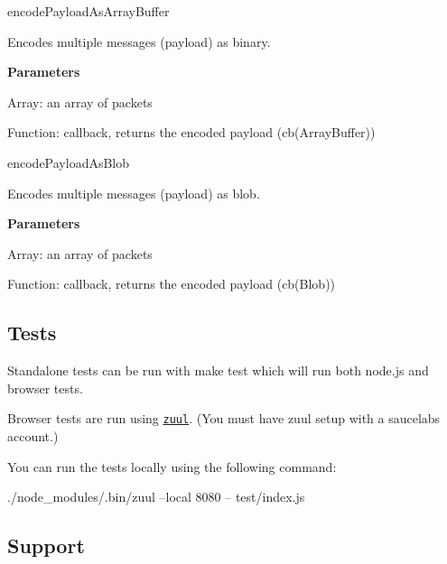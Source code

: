 \begin{DoxyItemize}
\item {\ttfamily encode\+Payload\+As\+Array\+Buffer}
\begin{DoxyItemize}
\item Encodes multiple messages (payload) as binary.
\item {\bfseries Parameters}
\begin{DoxyItemize}
\item {\ttfamily Array}\+: an array of packets
\item {\ttfamily Function}\+: callback, returns the encoded payload ({\ttfamily cb(\+Array\+Buffer)})
\end{DoxyItemize}
\end{DoxyItemize}
\item {\ttfamily encode\+Payload\+As\+Blob}
\begin{DoxyItemize}
\item Encodes multiple messages (payload) as blob.
\item {\bfseries Parameters}
\begin{DoxyItemize}
\item {\ttfamily Array}\+: an array of packets
\item {\ttfamily Function}\+: callback, returns the encoded payload ({\ttfamily cb(\+Blob)})
\end{DoxyItemize}
\end{DoxyItemize}
\end{DoxyItemize}

\subsection*{Tests}

Standalone tests can be run with {\ttfamily make test} which will run both node.\+js and browser tests.

Browser tests are run using \href{https://github.com/defunctzombie/zuul}{\tt zuul}. (You must have zuul setup with a saucelabs account.)

You can run the tests locally using the following command\+:


\begin{DoxyCode}
./node\_modules/.bin/zuul --local 8080 -- test/index.js
\end{DoxyCode}


\subsection*{Support}

